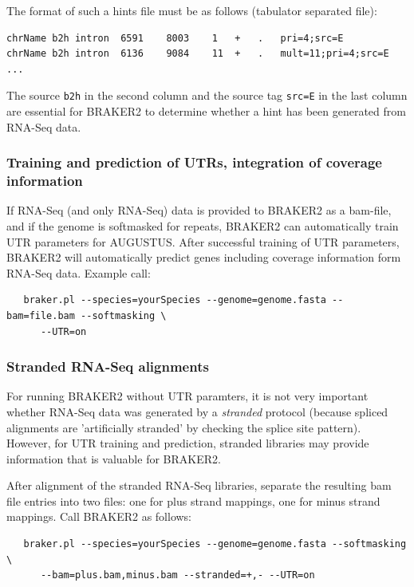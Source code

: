 \documentclass[a4paper,10pt]{report}
\begin{document}
The format of such a hints file must be as follows (tabulator separated file):

\begin{verbatim}
chrName	b2h	intron	6591	8003	1	+	.	pri=4;src=E
chrName	b2h	intron	6136	9084	11	+	.	mult=11;pri=4;src=E
...
\end{verbatim}

The source \texttt{b2h} in the second column and the source tag \texttt{src=E} in the last column are essential for BRAKER2 to determine whether a hint has been generated from RNA-Seq data. 

\subsubsection{Training and prediction of UTRs, integration of coverage information}

If RNA-Seq (and only RNA-Seq) data is provided to BRAKER2 as a bam-file, and if the genome is softmasked for repeats, BRAKER2 can automatically train UTR parameters for AUGUSTUS. After successful training of UTR parameters, BRAKER2 will automatically predict genes including coverage information form RNA-Seq data. Example call:

\begin{verbatim}
   braker.pl --species=yourSpecies --genome=genome.fasta --bam=file.bam --softmasking \
      --UTR=on
\end{verbatim}

\subsubsection{Stranded RNA-Seq alignments}

For running BRAKER2 without UTR paramters, it is not very important whether RNA-Seq data was generated by a \textit{stranded} protocol (because spliced alignments are 'artificially stranded' by checking the splice site pattern). However, for UTR training and prediction, stranded libraries may provide information that is valuable for BRAKER2.

After alignment of the stranded RNA-Seq libraries, separate the resulting bam file entries into two files: one for plus strand mappings, one for minus strand mappings. Call BRAKER2 as follows:

\begin{verbatim}
   braker.pl --species=yourSpecies --genome=genome.fasta --softmasking \
      --bam=plus.bam,minus.bam --stranded=+,- --UTR=on
\end{verbatim}
\end{document}
